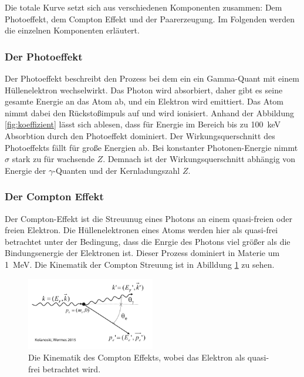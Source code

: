Die totale Kurve setzt sich aus verschiedenen Komponenten zusammen: Dem Photoeffekt, dem Compton Effekt und der Paarerzeugung.
Im Folgenden werden die einzelnen Komponenten erläutert.

\subsubsection{Der Photoeffekt}
\label{sec:photoeffekt}

Der Photoeffekt beschreibt den Prozess bei dem ein ein Gamma-Quant mit einem Hüllenelektron wechselwirkt.
Das Photon wird absorbiert, daher gibt es seine gesamte Energie an das Atom ab, und ein Elektron wird emittiert. 
Das Atom nimmt dabei den Rückstoßimpuls auf und wird ionisiert.
Anhand der Abbildung \ref{fig:koeffizient} lässt sich ablesen, dass für Energie im Bereich bis zu \qty{100}{\kilo\eV} 
Absorbtion durch den Photoeffekt dominiert. Der Wirkungsquerschnitt des Photoeffekts fällt für große Energien ab.
Bei konstanter Photonen-Energie nimmt $\sigma$ stark zu für wachsende $Z$.
Demnach ist der Wirkungsquerschnitt abhängig von Energie der $\gamma$-Quanten und der Kernladungszahl $Z$.

\subsubsection{Der Compton Effekt}
\label{sec:compton}

Der Compton-Effekt ist die Streuunug eines Photons an einem quasi-freien oder freien Elektron.
Die Hüllenelektronen eines Atoms werden hier als quasi-frei betrachtet unter der Bedingung, dass
die Enrgie des Photons viel größer als die Bindungsenergie der Elektronen ist. Dieser Prozess
dominiert in Materie um \qty{1}{\mega\eV}.
Die Kinematik der Compton Streuung ist in Abilldung \ref{fig:compton} zu sehen.

\begin{figure}[H]
    \centering
    \includegraphics[width=0.5\textwidth]{content/grafik/compton.jpg}
    \caption{Die Kinematik des Compton Effekts, wobei das Elektron als quasi-frei betrachtet wird.\cite{teilchendetektoren}}
    \label{fig:compton}
\end{figure}

